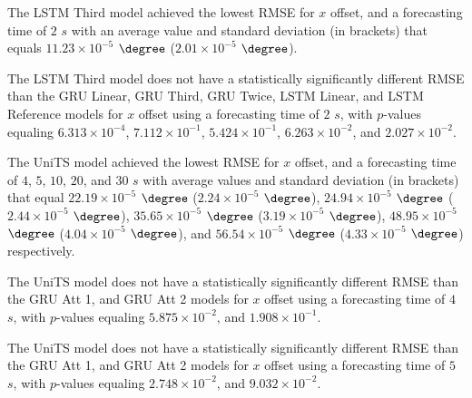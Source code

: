 The LSTM Third model achieved the lowest RMSE for $x$ offset, and a forecasting time of $2$ $s$ with an average value and standard deviation (in brackets) that equals $11.23 \times 10^{-5}$ $\degree$ ($2.01 \times 10^{-5}$ $\degree$).

The LSTM Third model does not have a statistically significantly different RMSE than the GRU Linear, GRU Third, GRU Twice, LSTM Linear, and LSTM Reference models for $x$ offset using a forecasting time of $2$ $s$, with $p$-values equaling $6.313 \times 10^{-4}$, $7.112 \times 10^{-1}$, $5.424 \times 10^{-1}$, $6.263 \times 10^{-2}$, and $2.027 \times 10^{-2}$.


The UniTS model achieved the lowest RMSE for $x$ offset, and a forecasting time of $4$, $5$, $10$, $20$, and $30$ $s$ with average values and standard deviation (in brackets) that equal $22.19 \times 10^{-5}$ $\degree$ ($2.24 \times 10^{-5}$ $\degree$), $24.94 \times 10^{-5}$ $\degree$ ($2.44 \times 10^{-5}$ $\degree$), $35.65 \times 10^{-5}$ $\degree$ ($3.19 \times 10^{-5}$ $\degree$), $48.95 \times 10^{-5}$ $\degree$ ($4.04 \times 10^{-5}$ $\degree$), and $56.54 \times 10^{-5}$ $\degree$ ($4.33 \times 10^{-5}$ $\degree$) respectively.

The UniTS model does not have a statistically significantly different RMSE than the GRU Att 1, and GRU Att 2 models for $x$ offset using a forecasting time of $4$ $s$, with $p$-values equaling $5.875 \times 10^{-2}$, and $1.908 \times 10^{-1}$.


The UniTS model does not have a statistically significantly different RMSE than the GRU Att 1, and GRU Att 2 models for $x$ offset using a forecasting time of $5$ $s$, with $p$-values equaling $2.748 \times 10^{-2}$, and $9.032 \times 10^{-2}$.


